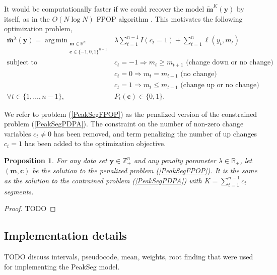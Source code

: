 \documentclass{article}
\newtheorem{proposition}{Proposition}
\DeclareMathOperator*{\argmin}{arg\,min}
\newcommand{\ZZ}{\mathbb Z}
\newcommand{\RR}{\mathbb R}
\begin{document}
It would be computationally faster if we could recover the model
$\mathbf{\tilde m}^{K}(\mathbf y)$ by itself, as in the $O(N\log N)$
FPOP algorithm \citep{johnson, FPOP}. This motivates the following
optimization problem,
\begin{align}
  \mathbf{\bar m}^\lambda(\mathbf y) =
    \argmin_{\substack{
  \mathbf m\in\RR^{n}
\\
  \mathbf c\in\{-1,0,1\}^{n-1}
  }} &\ \ 
\lambda\sum_{t=1}^{n-1} I(c_t =1)
+
\sum_{t=1}^n \ell(y_t, m_t) 
  \label{PeakSegFPOP}
\\
    \text{subject to} 
& \ \ c_t = -1 \Rightarrow m_{t} \geq m_{t+1} \text{ (change down or no change)}
\nonumber\\
& \ \ c_t = 0 \Rightarrow m_{t} = m_{t+1}  \text{ (no change)}
\nonumber\\
& \ \ c_t = 1 \Rightarrow m_{t} \leq m_{t+1} \text{ (change up or no change)}
\nonumber\\
\forall t\in\{1, \dots, n-1\}, &\ \ P_t(\mathbf c) \in\{0, 1\}.
\nonumber
\end{align}

We refer to problem (\ref{PeakSegFPOP}) as the penalized version of
the constrained problem (\ref{PeakSegPDPA}). The constraint on the
number of non-zero change variables $c_t\neq 0$ has been removed, and
term penalizing the number of up changes $c_t=1$ has been added to the
optimization objective.  

\begin{proposition}
  For any data set $\mathbf y\in\ZZ_+^n$ and any penalty parameter
  $\lambda\in\RR_+$, let $(\mathbf m,\mathbf c)$ be the solution to
  the penalized problem (\ref{PeakSegFPOP}). It is the same as the
  solution to the contrained problem (\ref{PeakSegPDPA}) with
  $K=\sum_{t=1}^{n-1} c_t$ segments.
\end{proposition}

\begin{proof}
  TODO
\end{proof}

\subsection{Implementation details}
\label{sec:implementation-details}
TODO discuss intervals, pseudocode, mean, weights, root finding that
were used for implementing the PeakSeg model.
\end{document}
